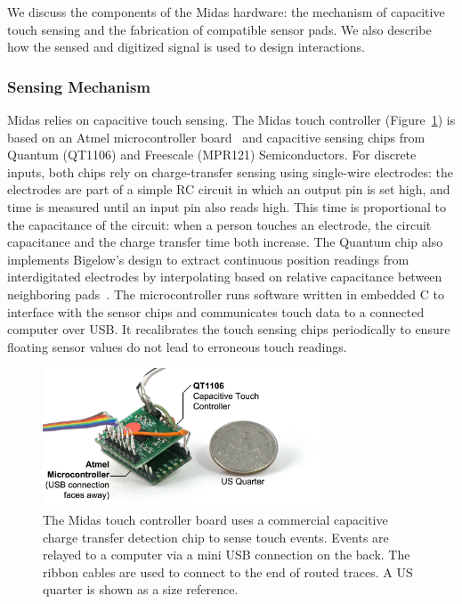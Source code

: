 We discuss the components of the Midas hardware: the mechanism of capacitive touch sensing and the fabrication of compatible sensor pads. We also describe how the sensed and digitized signal is used to design interactions.

    \subsubsection{Sensing Mechanism}

        Midas relies on capacitive touch sensing. The Midas touch controller (Figure~\ref{fig:midas-microcontroller}) is based on an Atmel microcontroller board~\cite{teensy} and capacitive sensing chips from Quantum (QT1106) and Freescale (MPR121) Semiconductors. For discrete inputs, both chips rely on charge-transfer sensing using single-wire electrodes: the electrodes are part of a simple RC circuit in which an output pin is set high, and time is measured until an input pin also reads high. This time is proportional to the capacitance of the circuit: when a person touches an electrode, the circuit capacitance and the charge transfer time both increase. The Quantum chip also implements Bigelow's design to extract continuous position readings from interdigitated electrodes by interpolating based on relative capacitance between neighboring pads~\cite{bigelow-interdigitated}. The microcontroller runs software written in embedded C to interface with the sensor chips and communicates touch data to a connected computer over USB. It recalibrates the touch sensing chips periodically to ensure floating sensor values do not lead to erroneous touch readings.
        
        \begin{figure}[b]
        \centering
\includegraphics[width=3.25in]{figures/midas/microcontroller1.jpg}
\caption{The Midas touch controller board uses a commercial capacitive charge transfer detection chip to sense touch events. Events are relayed to a computer via a mini USB connection on the back. The ribbon cables are used to connect to the end of routed traces. A US quarter is shown as a size reference.} 
\label{fig:midas-microcontroller}
\end{figure}

